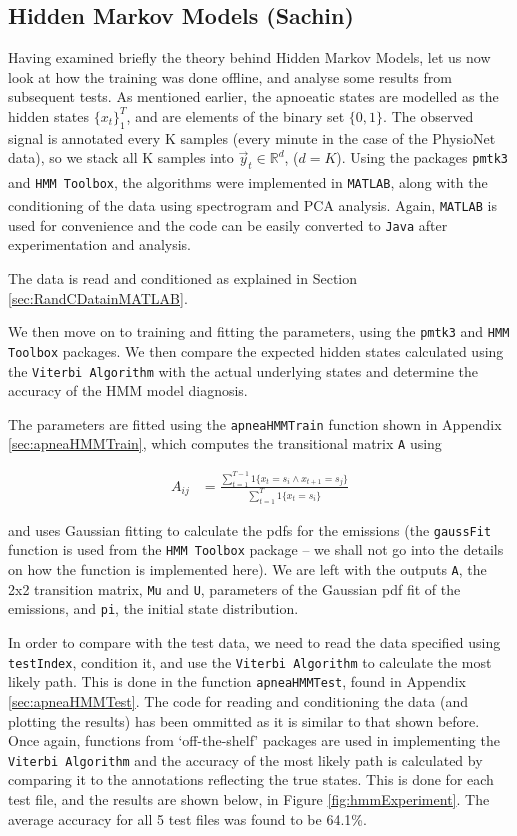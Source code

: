 \subsection{Hidden Markov Models (Sachin)}
\label{sec:hmmExperiments-sachin}

Having examined briefly the theory behind Hidden Markov Models, let us now look at how the training was done offline, and analyse some results from subsequent tests. As mentioned earlier, the apnoeatic states are modelled as the hidden states $\{x_t\}_1^T$, and are elements of the binary set $\{0, 1\}$. The observed signal is annotated every K samples (every minute in the case of the PhysioNet data), so we stack all K samples into $\vec y_t \in \mathbb{R}^d$, ($d = K$). Using the packages \verb!pmtk3! and \verb!HMM Toolbox!, the algorithms were implemented in \verb!MATLAB!\textsuperscript{\textregistered}, along with the conditioning of the data using spectrogram and PCA analysis. Again, \verb!MATLAB!\textsuperscript{\textregistered} is used for convenience and the code can be easily converted to \verb!Java! after experimentation and analysis.

The data is read and conditioned as explained in Section \ref{sec:RandCDatainMATLAB}.

We then move on to training and fitting the parameters, using the \verb!pmtk3! and \verb!HMM Toolbox! packages. We then compare the expected hidden states calculated using the \verb!Viterbi Algorithm! with the actual underlying states and determine the accuracy of the HMM model diagnosis.

The parameters are fitted using the \verb!apneaHMMTrain! function shown in Appendix \ref{sec:apneaHMMTrain}, which computes the transitional matrix \verb!A! using

\begin{align}
		A_{ij} & = \frac{\sum_{t = 1}^{T - 1} 1\{x_t = s_i \land x_{t + 1} = s_j\}}{\sum_{t = 1}^{T} 1\{x_t = s_i\}}
\end{align}

and uses Gaussian fitting to calculate the pdfs for the emissions (the \verb!gaussFit! function is used from the \verb!HMM Toolbox! package -- we shall not go into the details on how the function is implemented here). We are left with the outputs \verb!A!, the 2x2 transition matrix, \verb!Mu! and \verb!U!, parameters of the Gaussian pdf fit of the emissions, and \verb!pi!, the initial state distribution.

In order to compare with the test data, we need to read the data specified using \verb!testIndex!, condition it, and use the \verb!Viterbi Algorithm! to calculate the most likely path. This is done in the function \verb!apneaHMMTest!, found in Appendix \ref{sec:apneaHMMTest}. The code for reading and conditioning the data (and plotting the results) has been ommitted as it is similar to that shown before. Once again, functions from `off-the-shelf' packages are used in implementing the \verb!Viterbi Algorithm! and the accuracy of the most likely path is calculated by comparing it to the annotations reflecting the true states. This is done for each test file, and the results are shown below, in Figure \ref{fig:hmmExperiment}. The average accuracy for all 5 test files was found to be 64.1\%.

